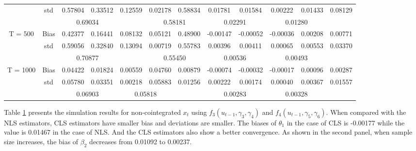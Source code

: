 \documentclass[a4paper,12pt,times,numbered,print,index]{report}
\numberwithin{equation}{section}
\begin{document}
\begin{table}[htbp]
\begin{adjustbox}{max width=\textwidth}
\begin{tabular}{cccccccccccc}
		& std   & 0.57804 & 0.33512 & 0.12559 & 0.02178 & 0.58834 & 0.01781 & 0.01584 & 0.00222 & 0.01433 & 0.08129 \\
		&       & \multicolumn{2}{c}{\textcolor[rgb]{ .329,  .51,  .208}{0.69034}} &       & \multicolumn{2}{c}{0.58181} & \multicolumn{2}{c}{\textcolor[rgb]{ .329,  .51,  .208}{0.02291}} & \multicolumn{2}{c}{0.01280} &  \\
		\multirow{3}[0]{*}{T = 500} & Bias  & 0.42377 & 0.16441 & 0.08132 & 0.05121 & 0.48900 & -0.00147 & -0.00052 & -0.00036 & 0.00208 & 0.00771 \\
		& std   & 0.59056 & 0.32840 & 0.13094 & 0.00719 & 0.55783 & 0.00396 & 0.00411 & 0.00065 & 0.00553 & 0.03370 \\
		&       & \multicolumn{2}{c}{\textcolor[rgb]{ .329,  .51,  .208}{0.70877}} &       & \multicolumn{2}{c}{0.55450} & \multicolumn{2}{c}{\textcolor[rgb]{ .329,  .51,  .208}{0.00536}} & \multicolumn{2}{c}{0.00493} &  \\
		\multirow{3}[1]{*}{T = 1000} & Bias  & 0.04422 & 0.01824 & 0.00559 & 0.04760 & 0.00879 & -0.00074 & -0.00032 & -0.00017 & 0.00096 & 0.00287 \\
		& std   & 0.05780 & 0.03351 & 0.00218 & 0.05883 & 0.01256 & 0.00222 & 0.00174 & 0.00040 & 0.00367 & 0.01557 \\
		&       & \multicolumn{2}{c}{\textcolor[rgb]{ .329,  .51,  .208}{0.06903}} & \multicolumn{2}{c}{0.05818} &       & \multicolumn{2}{c}{\textcolor[rgb]{ .329,  .51,  .208}{0.00283}} & \multicolumn{2}{c}{0.00328} &  \\
		\bottomrule
		\bottomrule
    	\end{tabular}%
		\end{adjustbox}
	\label{nonco-f12}%
\end{table}%

Table \ref{nonco-f12} presents the simulation results for non-cointegrated $x_t$ using $f_3 (u_{t-1}, \gamma_3, \gamma_4)$ and $f_4 (u_{t-1}, \gamma_5, \gamma_6)$. When compared with the NLS estimators, CLS estimators have smaller bias and deviations are smaller. The biases of $\theta_1$ in the case of CLS is -0.00177 while the value is 0.01467 in the case of NLS. And the CLS estimators also show a better convergence. As shown in the second panel, when sample size increases, the bias of $\beta_2$ decreases from 0.01092 to 0.00237. 
\end{document}

